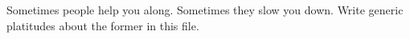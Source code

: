 Sometimes people help you along.  Sometimes they slow you down.  Write generic platitudes about the former in this file.